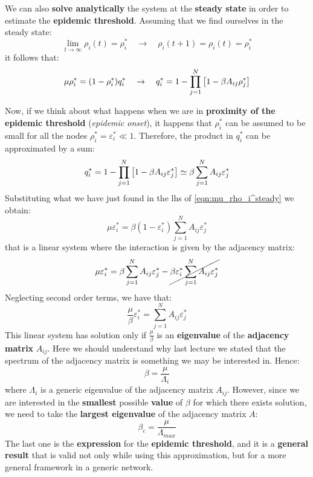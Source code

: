 \documentclass[../main/main.tex]{subfiles}
\begin{document}
We can also \textbf{solve analytically} the system at the \textbf{steady state} in order to estimate the \textbf{epidemic threshold}. Assuming that we find ourselves in the steady state:
\begin{equation*}
  \lim_{t \rightarrow \infty } \rho _i (t) = \rho _i ^* \quad \rightarrow \quad \rho _i (t+1) = \rho _i (t) = \rho _i^*
\end{equation*}
it follows that:
\begin{equation}
\label{eqn:mu_rho_i^steady}
  \mu \rho _i^* = (1- \rho _i^*) q_i^* \quad \rightarrow \quad q_i^* = 1 - \prod_{j=1}^{N} \qty[1- \beta A_{ij} \rho _j^*]
\end{equation}

Now, if we think about what happens when we are in \textbf{proximity of the epidemic threshold} (\textit{epidemic onset}), it happens that \( \rho _i^* \) can be assumed to be small for all the nodes \( \rho _i^* = \varepsilon _i^* \ll 1 \).
Therefore, the product in \( q_i^* \) can be approximated by a sum:
\begin{equation}
\label{eqn:q_prod}
  q_i^* = 1 - \prod_{j=1}^{N} \qty[1- \beta A_{ij} \varepsilon _j^*] \simeq \beta \sum_{j=1}^{N} A_{ij} \varepsilon _j^*
\end{equation}
Substituting what we have just found in the lhs of \ref{eqn:mu_rho_i^steady} we obtain:
\begin{equation}
  \mu \varepsilon _i^* = \beta (1- \varepsilon _i^*) \sum_{j=1}^{N} A_{ij} \varepsilon _{j}^*
\end{equation}
that is a linear system where the interaction is given by the adjacency matrix:
\begin{equation*}
  \mu \varepsilon _i^* = \beta \sum_{j=1}^{N} A_{ij} \varepsilon _{j}^* - \cancel{ \beta \varepsilon _i^* \sum_{j=1}^{N} A_{ij} \varepsilon _{j}^* }
\end{equation*}
Neglecting second order terms, we have that:
\begin{equation}
  \frac{\mu }{\beta } \varepsilon _i^* = \sum_{j=1}^{N} A_{ij} \varepsilon _j^*
\end{equation}
This linear system has solution only if \( \frac{\mu }{\beta } \) is an \textbf{eigenvalue} of the \textbf{adjacency matrix} \( A_{ij} \). Here we should understand why last lecture we stated that the spectrum of the adjacency matrix is something we may be interested in.
Hence:
\begin{equation}
  \beta = \frac{\mu }{\Lambda _i}
\end{equation}
where \( \Lambda _i \) is a generic eigenvalue of the adjacency matrix \( A_{ij} \). However, since we are interested in the \textbf{smallest} possible \textbf{value} of \( \beta  \) for which there exists solution, we need to take the \textbf{largest eigenvalue} of the adjacency matrix \( A \):
\begin{equation}
  \beta _c = \frac{\mu }{\Lambda _{max}}
\end{equation}
The last one is the \textbf{expression} for the \textbf{epidemic threshold}, and it is a \textbf{general result} that is valid not only while using this approximation, but for a more general framework in a generic network.
\end{document}
